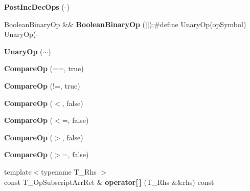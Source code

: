 \begin{DoxyCompactItemize}
\mbox{\label{classrlbox_1_1tainted__base__impl_a091f18be8cd32b34bec75322364e1f1d}} 
{\bfseries Post\+Inc\+Dec\+Ops} (-\/)
\item 
\mbox{\label{classrlbox_1_1tainted__base__impl_a59f056b2d926bd2c715aebb7295f0348}} 
Boolean\+Binary\+Op \&\& {\bfseries Boolean\+Binary\+Op} ($\vert$$\vert$);\#define Unary\+Op(op\+Symbol) Unary\+Op(-\/
\item 
\mbox{\label{classrlbox_1_1tainted__base__impl_ac450c85ec8fa3c5046bcf3fb7aeca2d1}} 
{\bfseries Unary\+Op} ($\sim$)
\item 
\mbox{\label{classrlbox_1_1tainted__base__impl_a257ae6c0b4a0fe1b1639044a572a038b}} 
{\bfseries Compare\+Op} (==, true)
\item 
\mbox{\label{classrlbox_1_1tainted__base__impl_a3d04a736a337294fc02a13baef2d78db}} 
{\bfseries Compare\+Op} (!=, true)
\item 
\mbox{\label{classrlbox_1_1tainted__base__impl_ac91498bde8eb4e3a384c666a65d5e7c0}} 
{\bfseries Compare\+Op} ($<$, false)
\item 
\mbox{\label{classrlbox_1_1tainted__base__impl_a2665ce9ccc644be5556c05fb26470468}} 
{\bfseries Compare\+Op} ($<$=, false)
\item 
\mbox{\label{classrlbox_1_1tainted__base__impl_a461a58872313be13c882039a4d286145}} 
{\bfseries Compare\+Op} ($>$, false)
\item 
\mbox{\label{classrlbox_1_1tainted__base__impl_af85745a199b95587d0d750439fae25bd}} 
{\bfseries Compare\+Op} ($>$=, false)
\item 
\mbox{\label{classrlbox_1_1tainted__base__impl_ad71e3e71f23ee730d9c6a9f9fc4d557e}} 
{\footnotesize template$<$typename T\+\_\+\+Rhs $>$ }\\const T\+\_\+\+Op\+Subscript\+Arr\+Ret \& {\bfseries operator\mbox{[}$\,$\mbox{]}} (T\+\_\+\+Rhs \&\&rhs) const
$$
\end{DoxyCompactItemize}
